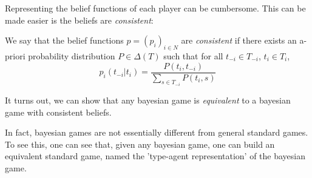  Representing the belief functions of each player can be cumbersome. This can be made easier is the beliefs are \emph{consistent}:
 \begin{definition}
 We say that the belief functions $p = (p_i)_{i \in N}$ are \emph{consistent} if there exists an a-priori probability distribution $P \in \Delta(T)$ such that for all $t_{-i} \in T_{-i} $, $t_i \in T_i$, 
  $$ p_i(t_{-{i}} | t_i) = \frac{P(t_i, t_{-i})}{\sum_{s \in T_{-i}} P( t_i, s) } $$
 \end{definition}
It turns out, we can show that any bayesian game is \emph{equivalent} to a bayesian game with consistent beliefs.
 
 
In fact, bayesian games are not essentially different from general standard games.  To see this, one can see that, given any bayesian game,  one can build an equivalent standard game, named the 'type-agent representation' of the bayesian game.

